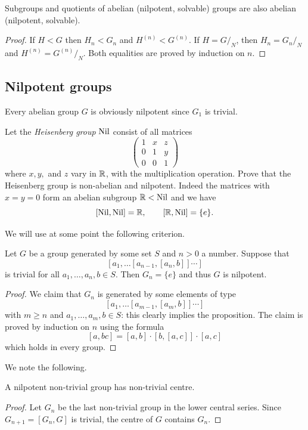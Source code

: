 \begin{prop} \label{subgroup:prop}
Subgroups and quotients of abelian (nilpotent, solvable) groups are also abelian (nilpotent, solvable).
\end{prop}
\begin{proof}
If $H<G$ then $H_n<G_n$ and $H^{(n)} < G^{(n)}$. If $H=G/_N$, then $H_n = G_n/_N$ and $H^{(n)} = G^{(n)}/_N$. Both equalities are proved by induction on $n$.
\end{proof}

\subsection{Nilpotent groups} \label{nilpotent:subsection}
Every abelian group $G$ is obviously nilpotent since $G_1$ is trivial. 

\begin{ex} \label{Heisenberg:ex}
Let the \emph{Heisenberg group} ${\rm Nil}$ consist of all matrices 
$$\begin{pmatrix} 1 & x & z \\ 0 & 1 & y \\ 0 & 0 & 1 \end{pmatrix}$$
where $x, y,$ and $z$ vary in $\mathbb{R}$, with the multiplication operation. Prove that the Heisenberg group is non-abelian and nilpotent. Indeed the matrices with $x=y=0$ form an abelian subgroup $\mathbb{R} < {\rm Nil}$ and we have
$$[{\rm Nil}, {\rm Nil}] = \mathbb{R}, \qquad [\mathbb{R}, {\rm Nil}] = \{e\}.$$
\end{ex}

We will use at some point the following criterion.

\begin{prop} \label{criterion:nilpotent:prop}
Let $G$ be a group generated by some set $S$ and $n>0$ a number. Suppose that
$$[a_1, \ldots [a_{n-1}, [a_n, b]] \cdots ]$$
is trivial for all $a_1,\ldots,a_n,b \in S$. Then $G_n=\{e\}$ and thus $G$ is nilpotent.
\end{prop}
\begin{proof}
We claim that $G_n$ is generated by some elements of type
$$[a_1, \ldots [a_{m-1}, [a_m, b]] \cdots ]$$
with $m\geqslant n$ and $a_1,\ldots,a_m,b\in S$: this clearly implies the proposition.
The claim is proved by induction on $n$ using the formula
$$[a,bc] = [a,b]\cdot [b,[a,c]]\cdot [a,c]$$
which holds in every group.
\end{proof}

We note the following. 
\begin{prop} \label{center:prop}
A nilpotent non-trivial group has non-trivial centre.
\end{prop}
\begin{proof}
Let $G_n$ be the last non-trivial group in the lower central series. Since $G_{n+1} = [G_n,G]$ is trivial, the centre of $G$ contains $G_n$.
\end{proof}

